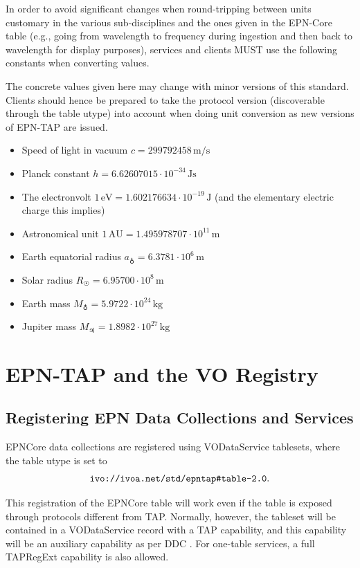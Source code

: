 \documentclass[11pt,a4paper]{ivoa}
\begin{document}
In order to avoid significant changes when round-tripping between units
customary in the various sub-disciplines and the ones given in the
EPN-Core table (e.g., going from wavelength to frequency during
ingestion and then back to wavelength for display purposes), services
and clients MUST use the following constants when converting values.

The concrete values given here may change with minor versions of this
standard.  Clients should hence be prepared to take the protocol
version (discoverable through the table utype) into account when doing
unit conversion as new versions of EPN-TAP are issued.

\begin{itemize}
\def\.#1{\textrm{#1}}
\item Speed of light in vacuum $c=299792458\,\.m/\.s$
\item Planck constant $h=6.62607015\cdot 10^{-34}\,\.J\.s$
\item The electronvolt $1\,\.{eV}=1.602176634\cdot 10^{-19}\,\.J$ (and
the elementary electric charge this implies)
\item Astronomical unit $1\,\.{AU}=1.495978707\cdot10^{11}\,\.m$
\item Earth equatorial radius $a_{\earth}=6.3781\cdot 10^6\,\.m$
\item Solar radius $R_{\astrosun}=6.95700\cdot10^8\,\.m$
\item Earth mass $M_{\earth}=5.9722\cdot 10^{24}\,\.{kg}$
\item Jupiter mass $M_{\jupiter}=1.8982\cdot 10^{27}\,\.{kg}$
\end{itemize}


\section{EPN-TAP and the VO Registry}
\label{sect:registry}

\subsection{Registering EPN Data Collections and Services}

EPNCore data collections are registered using VODataService
\citep{2021ivoa.spec.1102D} tablesets, where the table utype is set to
$$\hbox{\verb|ivo://ivoa.net/std/epntap#table-2.0|}.$$

This registration of the EPNCore table will work even if the table is
exposed through protocols different from TAP.  Normally, however, the
tableset will be contained in a VODataService 
record with a TAP capability, and this capability will be an auxiliary
capability as per DDC \citep{2019ivoa.spec.0520D}.  For one-table
services, a full TAPRegExt \citep{2012ivoa.spec.0827D} capability is also
allowed.
\end{document}

